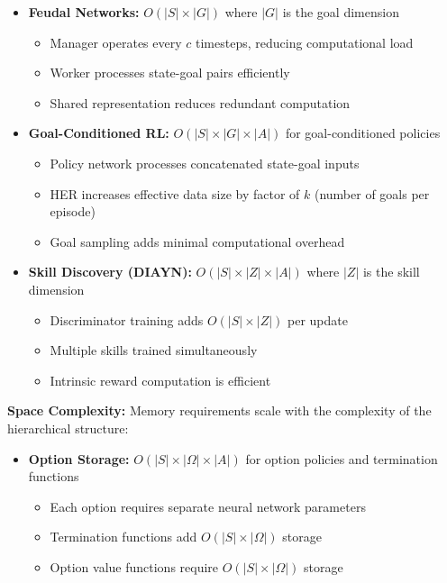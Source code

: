 \documentclass[12pt]{article}
\begin{document}
{{\begin{itemize}
    \item \textbf{Feudal Networks:} $O(|S| \times |G|)$ where $|G|$ is the goal dimension
    \begin{itemize}
        \item Manager operates every $c$ timesteps, reducing computational load
        \item Worker processes state-goal pairs efficiently
        \item Shared representation reduces redundant computation
    \end{itemize}
    
    \item \textbf{Goal-Conditioned RL:} $O(|S| \times |G| \times |A|)$ for goal-conditioned policies
    \begin{itemize}
        \item Policy network processes concatenated state-goal inputs
        \item HER increases effective data size by factor of $k$ (number of goals per episode)
        \item Goal sampling adds minimal computational overhead
    \end{itemize}
    
    \item \textbf{Skill Discovery (DIAYN):} $O(|S| \times |Z| \times |A|)$ where $|Z|$ is the skill dimension
    \begin{itemize}
        \item Discriminator training adds $O(|S| \times |Z|)$ per update
        \item Multiple skills trained simultaneously
        \item Intrinsic reward computation is efficient
    \end{itemize}
\end{itemize}

\textbf{Space Complexity:}
Memory requirements scale with the complexity of the hierarchical structure:

\begin{itemize}
    \item \textbf{Option Storage:} $O(|S| \times |\Omega| \times |A|)$ for option policies and termination functions
    \begin{itemize}
        \item Each option requires separate neural network parameters
        \item Termination functions add $O(|S| \times |\Omega|)$ storage
        \item Option value functions require $O(|S| \times |\Omega|)$ storage
    \end{itemize}
    

\end{itemize}}}
\end{document}
